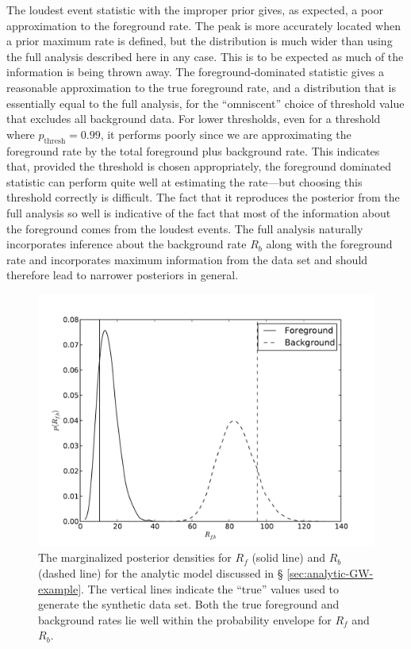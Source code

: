\documentclass[aps,prd]{revtex4-1}
\begin{document}
The loudest event statistic with the improper prior gives, as
expected, a poor approximation to the foreground rate. The peak is
more accurately located when a prior maximum rate is defined, but the
distribution is much wider than using the full analysis described here
in any case. This is to be expected as much of the information is
being thrown away. The foreground-dominated statistic gives a
reasonable approximation to the true foreground rate, and a
distribution that is essentially equal to the full analysis, for the
``omniscent'' choice of threshold value that excludes all background
data. For lower thresholds, even for a threshold where
$p_\mathrm{thresh} = 0.99$, it performs poorly since we are
approximating the foreground rate by the total foreground plus
background rate.  This indicates that, provided the threshold is
chosen appropriately, the foreground dominated statistic can perform
quite well at estimating the rate---but choosing this threshold
correctly is difficult. The fact that it reproduces the posterior from
the full analysis so well is indicative of the fact that most of the
information about the foreground comes from the loudest events. The
full analysis naturally incorporates inference about the background
rate $R_b$ along with the foreground rate and incorporates maximum
information from the data set and should therefore lead to narrower
posteriors in general.

\begin{figure}
  \includegraphics[width=\columnwidth]{rates}
  \caption{\label{fig:analytic-rate-recovery} The marginalized
    posterior densities for $R_f$ (solid line) and $R_b$ (dashed line)
    for the analytic model discussed in \S
    \ref{sec:analytic-GW-example}.  The vertical lines indicate the
    ``true'' values used to generate the synthetic data set.  Both the
    true foreground and background rates lie well within the
    probability envelope for $R_f$ and $R_b$.}
\end{figure}
\end{document}
